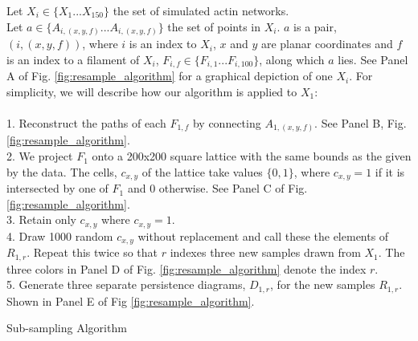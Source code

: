 \documentclass[10pt]{article}
\begin{document}
\begin{algorithm}[H]\label{alg:resample}
	Let $X_i \in \{X_1...X_{150}\}$ the set of simulated actin networks. \\
    Let $a \in \{A_{i,(x,y,f)}...A_{i,(x,y,f)}\}$ the set of points in $X_i$. $a$ is a pair, $(i, (x,y,f))$, where $i$ is an index to $X_i$, $x$ and $y$ are planar coordinates and $f$ is an index to a filament of $X_i$, $F_{i,f} \in \{F_{i,1}...F_{i,100}\}$, along which $a$ lies. See Panel A of Fig. \ref{fig:resample_algorithm} for a graphical depiction of one $X_i$. For simplicity, we will describe how our algorithm is applied to $X_1$:\\\\
	1. Reconstruct the paths of each $F_{1,f}$ by connecting $A_{1,(x,y,f)}$. See Panel B, Fig. \ref{fig:resample_algorithm}.\\
	2. We project $F_1$ onto a 200x200 square lattice with the same bounds as the given by the data. The cells, $c_{x,y}$ of the lattice take values $\{0,1\}$, where $c_{x,y}=1$ if it is intersected by one of $F_1$ and 0 otherwise. See Panel C of Fig. \ref{fig:resample_algorithm}.\\
	3. Retain only $c_{x,y}$ where $c_{x,y}=1$.\\
	4. Draw 1000 random $c_{x,y}$ without replacement and call these the elements of $R_{1, r}$. Repeat this twice so that $r$ indexes three new samples drawn from $X_1$. The three colors in Panel D of Fig. \ref{fig:resample_algorithm} denote the index $r$.\\
	5. Generate three separate persistence diagrams, $D_{1,r}$, for the new samples $R_{1,r}$. Shown in Panel E of Fig \ref{fig:resample_algorithm}.	\caption{Sub-sampling Algorithm}
\end{algorithm}
\end{document}
